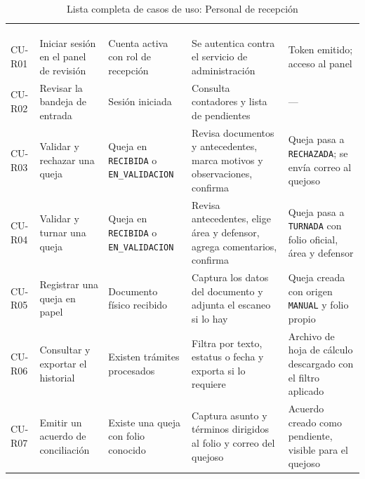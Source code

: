 \footnotesize
\renewcommand{\arraystretch}{1.2}
\setlength{\tabcolsep}{4pt}
\begin{longtable}{|L{1.6cm}|L{3.0cm}|L{2.9cm}|L{4.2cm}|L{3.5cm}|}
	\hiderowcolors\caption{Lista completa de casos de uso: Personal de recepción}
	\label{tab:anx_cu_recepcion} \\ \showrowcolors
	\hline
	 &  &  &  &  \\
	\hline
	\endfirsthead
	\hline
	 &  &  &  &  \\
	\hline
	\endhead
	CU-R01 & Iniciar sesión en el panel de revisión & Cuenta activa con rol de recepción & Se autentica contra el servicio de administración & Token emitido; acceso al panel \\ \hline
	CU-R02 & Revisar la bandeja de entrada & Sesión iniciada & Consulta contadores y lista de pendientes & --- \\ \hline
	CU-R03 & Validar y rechazar una queja & Queja en \texttt{RECIBIDA} o \texttt{EN\_VALIDACION} & Revisa documentos y antecedentes, marca motivos y observaciones, confirma & Queja pasa a \texttt{RECHAZADA}; se envía correo al quejoso \\ \hline
	CU-R04 & Validar y turnar una queja & Queja en \texttt{RECIBIDA} o \texttt{EN\_VALIDACION} & Revisa antecedentes, elige área y defensor, agrega comentarios, confirma & Queja pasa a \texttt{TURNADA} con folio oficial, área y defensor \\ \hline
	CU-R05 & Registrar una queja en papel & Documento físico recibido & Captura los datos del documento y adjunta el escaneo si lo hay & Queja creada con origen \texttt{MANUAL} y folio propio \\ \hline
	CU-R06 & Consultar y exportar el historial & Existen trámites procesados & Filtra por texto, estatus o fecha y exporta si lo requiere & Archivo de hoja de cálculo descargado con el filtro aplicado \\ \hline
	CU-R07 & Emitir un acuerdo de conciliación & Existe una queja con folio conocido & Captura asunto y términos dirigidos al folio y correo del quejoso & Acuerdo creado como pendiente, visible para el quejoso \\ \hline
\end{longtable}
\normalsize
\setlength{\tabcolsep}{6pt}
\renewcommand{\arraystretch}{1}

